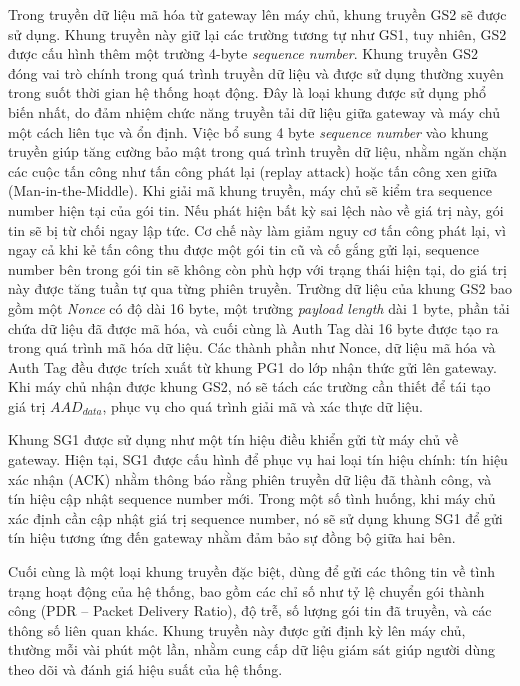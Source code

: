 Trong truyền dữ liệu mã hóa từ gateway lên máy chủ, khung truyền GS2 sẽ được sử dụng. Khung truyền này giữ lại các trường tương tự như GS1, tuy nhiên, GS2 được cấu hình thêm một trường 4-byte \textit{sequence number}. Khung truyền GS2 đóng vai trò chính trong quá trình truyền dữ liệu và được sử dụng thường xuyên trong suốt thời gian hệ thống hoạt động. Đây là loại khung được sử dụng phổ biến nhất, do đảm nhiệm chức năng truyền tải dữ liệu giữa gateway và máy chủ một cách liên tục và ổn định. Việc bổ sung 4 byte \textit{sequence number} vào khung truyền giúp tăng cường bảo mật trong quá trình truyền dữ liệu, nhằm ngăn chặn các cuộc tấn công như tấn công phát lại (replay attack) hoặc tấn công xen giữa (Man-in-the-Middle). Khi giải mã khung truyền, máy chủ sẽ kiểm tra sequence number hiện tại của gói tin. Nếu phát hiện bất kỳ sai lệch nào về giá trị này, gói tin sẽ bị từ chối ngay lập tức. Cơ chế này làm giảm nguy cơ tấn công phát lại, vì ngay cả khi kẻ tấn công thu được một gói tin cũ và cố gắng gửi lại, sequence number bên trong gói tin sẽ không còn phù hợp với trạng thái hiện tại, do giá trị này được tăng tuần tự qua từng phiên truyền. Trường dữ liệu của khung GS2 bao gồm một \textit{Nonce} có độ dài 16 byte, một trường \textit{payload length} dài 1 byte, phần tải chứa dữ liệu đã được mã hóa, và cuối cùng là Auth Tag dài 16 byte được tạo ra trong quá trình mã hóa dữ liệu. Các thành phần như Nonce, dữ liệu mã hóa và Auth Tag đều được trích xuất từ khung PG1 do lớp nhận thức gửi lên gateway. Khi máy chủ nhận được khung GS2, nó sẽ tách các trường cần thiết để tái tạo giá trị $AAD_{data}$, phục vụ cho quá trình giải mã và xác thực dữ liệu.

Khung SG1 được sử dụng như một tín hiệu điều khiển gửi từ máy chủ về gateway. Hiện tại, SG1 được cấu hình để phục vụ hai loại tín hiệu chính: tín hiệu xác nhận (ACK) nhằm thông báo rằng phiên truyền dữ liệu đã thành công, và tín hiệu cập nhật sequence number mới. Trong một số tình huống, khi máy chủ xác định cần cập nhật giá trị sequence number, nó sẽ sử dụng khung SG1 để gửi tín hiệu tương ứng đến gateway nhằm đảm bảo sự đồng bộ giữa hai bên.

Cuối cùng là một loại khung truyền đặc biệt, dùng để gửi các thông tin về tình trạng hoạt động của hệ thống, bao gồm các chỉ số như tỷ lệ chuyển gói thành công (PDR – Packet Delivery Ratio), độ trễ, số lượng gói tin đã truyền, và các thông số liên quan khác. Khung truyền này được gửi định kỳ lên máy chủ, thường mỗi vài phút một lần, nhằm cung cấp dữ liệu giám sát giúp người dùng theo dõi và đánh giá hiệu suất của hệ thống.

